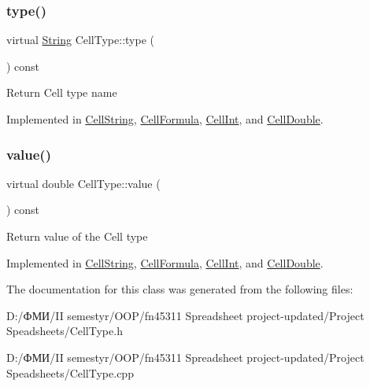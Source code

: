 \subsubsection{\texorpdfstring{type()}{type()}}
{\footnotesize\ttfamily virtual \hyperlink{class_string}{String} Cell\+Type\+::type (\begin{DoxyParamCaption}{ }\end{DoxyParamCaption}) const\hspace{0.3cm}{\ttfamily [pure virtual]}}

Return Cell type name 

Implemented in \hyperlink{class_cell_string_a0670fd5a35f8e05c985379acd5e4b88f}{Cell\+String}, \hyperlink{class_cell_formula_ae175fd79ee036efa3a968f37b8eb53bc}{Cell\+Formula}, \hyperlink{class_cell_int_a65c7fa9731cc6f5b40579f314ba090dd}{Cell\+Int}, and \hyperlink{class_cell_double_a73662d15e8626c81858e3a243f0d6818}{Cell\+Double}.

\mbox{\label{class_cell_type_a6cbfc477f605049f2a007d8674442230}} 
\subsubsection{\texorpdfstring{value()}{value()}}
{\footnotesize\ttfamily virtual double Cell\+Type\+::value (\begin{DoxyParamCaption}{ }\end{DoxyParamCaption}) const\hspace{0.3cm}{\ttfamily [pure virtual]}}

Return value of the Cell type 

Implemented in \hyperlink{class_cell_string_a452054b2d80356d66ed7504d7b1b8d69}{Cell\+String}, \hyperlink{class_cell_formula_a29d9e3000ae3f0b0ebac72807a455fec}{Cell\+Formula}, \hyperlink{class_cell_int_a1be32d235fbcc58483948770fb7ce9c6}{Cell\+Int}, and \hyperlink{class_cell_double_a6ed39c7b32c0599b4db0f046c7cfab93}{Cell\+Double}.



The documentation for this class was generated from the following files\+:\begin{DoxyCompactItemize}
\item 
D\+:/ФМИ/\+I\+I semestyr/\+O\+O\+P/fn45311 Spreadsheet project-\/updated/\+Project Speadsheets/Cell\+Type.\+h\item 
D\+:/ФМИ/\+I\+I semestyr/\+O\+O\+P/fn45311 Spreadsheet project-\/updated/\+Project Speadsheets/Cell\+Type.\+cpp\end{DoxyCompactItemize}
